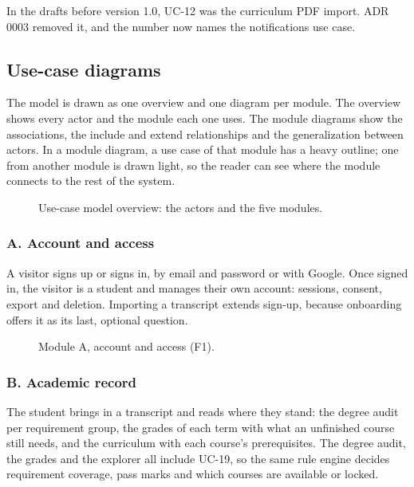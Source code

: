 \documentclass{article}
\begin{document}
In the drafts before version 1.0, UC-12 was the curriculum PDF import. ADR 0003 removed it, and the number now names the notifications use case.

\subsection{Use-case diagrams}
The model is drawn as one overview and one diagram per module. The overview shows every actor and the module each one
uses. The module diagrams show the associations, the \guillemotleft include\guillemotright{} and
\guillemotleft extend\guillemotright{} relationships and the generalization between actors. In a module diagram, a use case
of that module has a heavy outline; one from another module is drawn light, so the reader can see where the module
connects to the rest of the system.

\begin{figure}[H]
  \centering
  
  \caption{Use-case model overview: the actors and the five modules.}
  \label{fig:overview}
\end{figure}

\clearpage
\subsubsection{A. Account and access}
A visitor signs up or signs in, by email and password or with Google. Once signed in, the visitor is a student and manages
their own account: sessions, consent, export and deletion. Importing a transcript extends sign-up, because onboarding offers
it as its last, optional question.

\begin{figure}[H]
  \centering
  \par\vspace{6pt}\uclegend
  \caption{Module A, account and access (F1).}
  \label{fig:account}
\end{figure}

\subsubsection{B. Academic record}
The student brings in a transcript and reads where they stand: the degree audit per requirement group, the grades of each
term with what an unfinished course still needs, and the curriculum with each course's prerequisites. The degree audit,
the grades and the explorer all include UC-19, so the same rule engine decides requirement coverage, pass marks and which
courses are available or locked.
\end{document}

